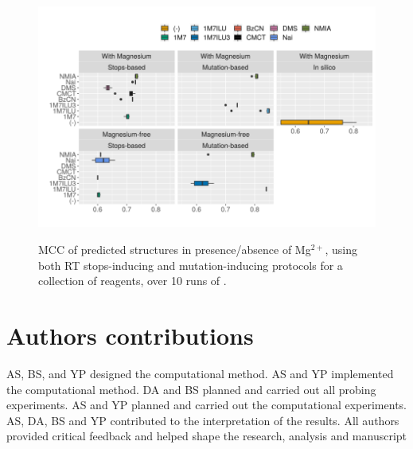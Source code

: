 \documentclass[a4,center,fleqn]{NAR}
\begin{document}
\begin{figure}
	{\centering\includegraphics[width=1\linewidth]{graphs/boxplotreproducibility.png}\\}
	
	\caption{MCC of predicted structures in presence/absence of Mg$^{2+}$, using both RT stops-inducing and mutation-inducing protocols for a collection of reagents, over 10 runs of \OurTool{}. }\label{fig:reproducibility}
\end{figure}




%
%
%
%
%	
%	

\section*{Authors contributions}
AS, BS, and YP designed the computational method. 
AS and YP implemented the computational method.
DA and BS planned and carried out all probing experiments.
AS and YP planned and carried out the computational experiments. 
AS, DA, BS and YP contributed to the interpretation of the results. 
All authors provided critical feedback and helped shape the research, analysis and manuscript
\end{document}
